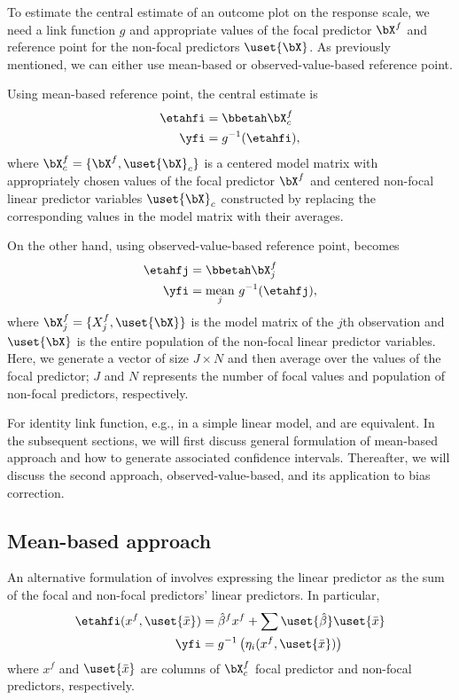 To estimate the central estimate of an outcome plot on the response scale, we need a link function $g$ and appropriate values of the focal predictor $\bX^{f}$ and reference point for the non-focal predictors $\uset{{\bX}}$. As previously mentioned, we can either use mean-based or observed-value-based reference point. 

Using mean-based reference point, the central estimate is
%
\begin{align}\label{eq:eta_linear_mean}
\etahfi &= \bbetah \bX^{f}_c \nonumber\\
\yfi &= g^{-1}(\etahfi),
\end{align}
%
where $\bX^{f}_c = \{\bX^{f}, \uset{{\bX}}_c\}$ is a centered model matrix with appropriately chosen values of the focal predictor $\bX^{f}$ and centered non-focal linear predictor variables $\uset{{\bX}}_c$ constructed by replacing the corresponding values in the model matrix with their averages. 

On the other hand, using observed-value-based reference point, 
becomes
%
\begin{align}\label{eq:eta_linear_sample}
\etahfj &= \bbetah \bX^{f}_j \nonumber\\
\yfi  &= \underset{j}{\textrm{mean}} ~ g^{-1} (\etahfj),
\end{align}
%
where $\bX^{f}_j = \{X^{f}_j, \uset{{\bX}}\}$ is the model matrix of the $j$th
observation and $\uset{{\bX}}$ is the entire population of the non-focal linear
predictor variables. Here, we generate a vector of size $J \times N$ and then average over the values of the focal predictor; $J$ and $N$ represents the number of focal values and population of non-focal predictors, respectively.

For identity link function, e.g., in a simple linear model,  and  are equivalent. In the subsequent sections, we will first discuss general formulation of mean-based approach and how to generate associated confidence intervals. Thereafter, we will discuss the second approach, observed-value-based, and its application to bias correction.


\subsection{Mean-based approach}

An alternative formulation of  involves expressing the linear predictor as the sum of the focal and non-focal predictors' linear predictors. In particular, 
%
\begin{align}\label{eq:eta_mean}
\etahfi(x^f, \uset{{\bar{x}}}) &= \hat{\beta}^f x^f + \sum \uset{\hat{\beta}} \uset{{\bar{x}}} \\
\yfi  &= g^{-1} \left(\eta_i(x^f, \uset{{\bar{x}}})\right)
\end{align}
where $x^f$ and $\uset{{\bar{x}}}$ are columns of $\bX^{f}_c$ focal predictor and non-focal predictors, respectively.

